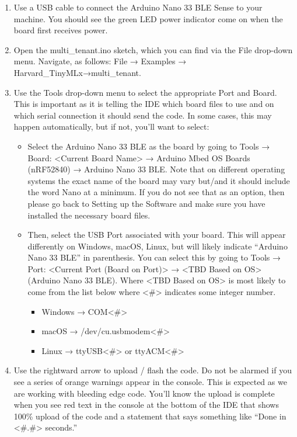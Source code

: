 \begin{enumerate}
  \item Use a USB cable to connect the Arduino Nano 33 BLE Sense to your machine. You should see the green LED power indicator come on when the board first receives power.

  \item Open the multi\_tenant.ino sketch, which you can find via the File drop-down menu. Navigate, as follows: File → Examples → Harvard\_TinyMLx→multi\_tenant.

  \item Use the Tools drop-down menu to select the appropriate Port and Board. This is important as it is telling the IDE which board files to use and on which serial connection it should send the code. In some cases, this may happen automatically, but if not, you’ll want to select: 

    \begin{itemize}
      \item Select the Arduino Nano 33 BLE as the board by going to Tools → Board: <Current Board Name> → Arduino Mbed OS Boards (nRF52840) → Arduino Nano 33 BLE. Note that on different operating systems the exact name of the board may vary but/and it should include the word Nano at a minimum. If you do not see that as an option, then please go back to Setting up the Software and make sure you have installed the necessary board files.

      \item Then, select the USB Port associated with your board. This will appear differently on Windows, macOS, Linux, but will likely indicate ``Arduino Nano 33 BLE'' in parenthesis. You can select this by going to Tools → Port: <Current Port (Board on Port)> → <TBD Based on OS> (Arduino Nano 33 BLE). Where <TBD Based on OS> is most likely to come from the list below where <\#> indicates some integer number.

        \begin{itemize}
          \item Windows → COM<\#>
          \item macOS → /dev/cu.usbmodem<\#>
          \item Linux → ttyUSB<\#> or ttyACM<\#>
        \end{itemize}
    \end{itemize}

  \item Use the rightward arrow to upload / flash the code. Do not be alarmed if you see a series of orange warnings appear in the console. This is expected as we are working with bleeding edge code. You'll know the upload is complete when you see red text in the console at the bottom of the IDE that shows 100\% upload of the code and a statement that says something like ``Done in <\#.\#> seconds.''


\end{enumerate}

